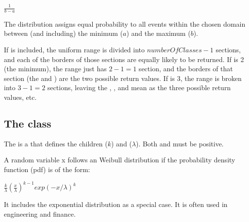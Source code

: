 \begin{center}
$\frac{1}{b-a}$
\end{center}

The distribution assigns equal probability to all events within the chosen domain between (and including) the minimum ($a$) and the maximum ($b$).

If  is included, the uniform range is divided into $numberOfClasses-1$ sections, and each of the borders of those sections are equally likely to be returned.  If  is 2 (the minimum), the range just has $2-1=1$ section, and the borders of that section (the  and ) are the two possible return values.  If  is 3, the range is broken into $3-1=2$ sections, leaving the , , and mean as the three possible return values, etc.

\subsection{The  class}
\label{WeibullDistribution-class}
\label{weibulldistribution-class}

The \WeibullDistribution is a \ContinuousUnivariateDistribution that defines the \UncertValue children  ($k$) and  ($\lambda$).  Both  and  must be positive.

A random variable x follows an Weibull distribution if the probability density function (pdf) is of the form:

\begin{center}
$\frac{k}{\lambda}\left(\frac{x}{\lambda}\right)^{k-1}exp(-x/\lambda)^k$
\end{center}

It includes the exponential distribution as a special case. It is often used in engineering and finance.

